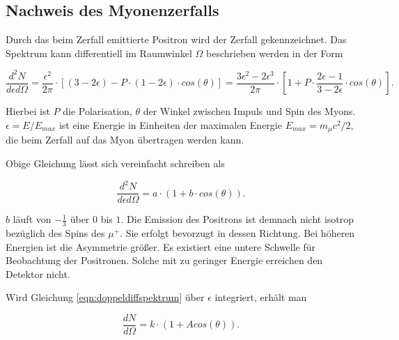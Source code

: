 \documentclass[a4paper,ngerman]{scrartcl}
\begin{document}



\subsection{Nachweis des Myonenzerfalls}
\label{sec:nachweis}


Durch das beim Zerfall emittierte Positron wird der Zerfall gekennzeichnet. Das Spektrum kann differentiell im Raumwinkel $\Omega$ beschrieben werden in der Form

\begin{equation}
\label{eqn:doppeldiffspektrum}
\frac{d^2N}{d\epsilon d\Omega} = \frac{\epsilon^2}{2 \pi} \cdot \left[  (3- 2\epsilon) - P \cdot (1-2\epsilon) \cdot cos(\theta)  \right] = \frac{3 \epsilon^2 - 2 \epsilon^3}{2 \pi} \cdot \left[  1 + P \cdot \frac{2 \epsilon -1}{3 - 2\epsilon} \cdot cos(\theta)  \right] .
\end{equation}

Hierbei ist $P$ die Polarisation, $\theta$ der Winkel zwischen Impuls und Spin des Myons. $\epsilon = E / E_{max}$ ist eine Energie in Einheiten der maximalen Energie $E_{max} = m_{\mu}c^2/2$, die beim Zerfall auf das Myon übertragen werden kann. 

Obige Gleichung lässt sich vereinfacht schreiben als

\begin{equation}
\frac{d^2N}{d\epsilon d\Omega} = a \cdot (1 + b \cdot cos(\theta) ) .
\end{equation}

$b$ läuft von $-\frac{1}{3}$ über $0$ bis $1$. Die Emission des Positrons ist demnach nicht isotrop bezüglich des Spins des $\mu^{+}$. Sie erfolgt bevorzugt in dessen Richtung. Bei höheren Energien ist die Asymmetrie größer. Es existiert eine untere Schwelle für Beobachtung der Positronen. Solche mit zu geringer Energie erreichen den Detektor nicht. 

Wird Gleichung \ref{eqn:doppeldiffspektrum} über $\epsilon$ integriert, erhält man

\begin{equation}
\label{eqn:spektrum}
\frac{dN}{ d\Omega} = k \cdot (1 + A cos(\theta) ).
\end{equation}
\end{document}
